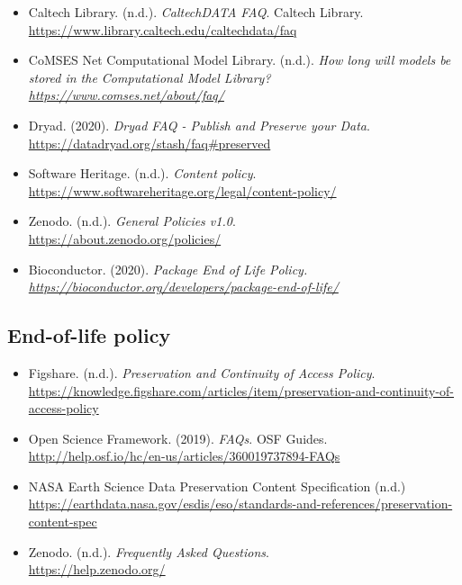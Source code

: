 \documentclass[11pt]{article}
\begin{document}
\begin{itemize}

\item Caltech Library. (n.d.). \emph{CaltechDATA FAQ}. Caltech Library.\\
\url{https://www.library.caltech.edu/caltechdata/faq}

\item CoMSES Net Computational Model Library. (n.d.). \emph{How long will models be stored in the Computational Model Library?\\
\url{https://www.comses.net/about/faq/}}

\item Dryad. (2020). \emph{Dryad FAQ - Publish and Preserve your Data}.\\
\url{https://datadryad.org/stash/faq\#preserved}

\item Software Heritage. (n.d.). \emph{Content policy}.\\
\url{https://www.softwareheritage.org/legal/content-policy/}

\item Zenodo. (n.d.). \emph{General Policies v1.0}.\\
\url{https://about.zenodo.org/policies/}

\item Bioconductor. (2020). \emph{Package End of Life Policy.\\
\url{https://bioconductor.org/developers/package-end-of-life/} }

\end{itemize}


\subsection{End-of-life policy}
\label{end-of-life-policy}

\begin{itemize}

\item Figshare. (n.d.). \emph{Preservation and Continuity of Access Policy}.\\
\url{https://knowledge.figshare.com/articles/item/preservation-and-continuity-of-access-policy}

\item Open Science Framework. (2019). \emph{FAQs}. OSF Guides.\\
\url{http://help.osf.io/hc/en-us/articles/360019737894-FAQs}

\item NASA Earth Science Data Preservation Content Specification (n.d.)\\
\url{https://earthdata.nasa.gov/esdis/eso/standards-and-references/preservation-content-spec}

\item Zenodo. (n.d.). \emph{Frequently Asked Questions}.\\
\url{https://help.zenodo.org/}

\end{itemize}
\end{document}
